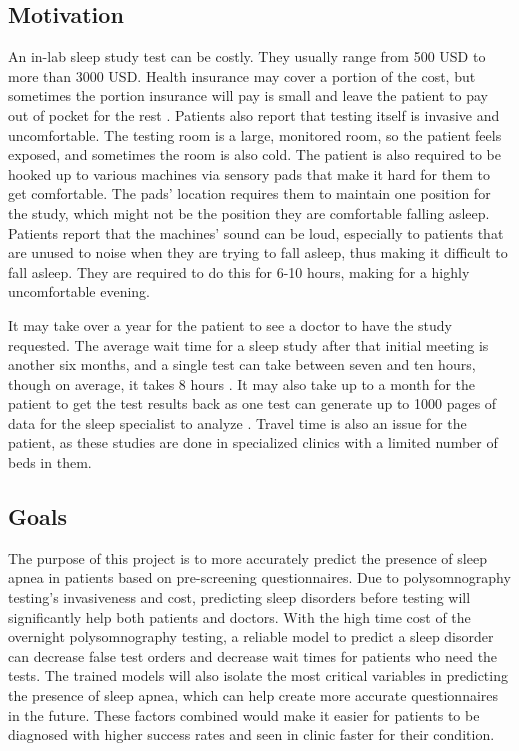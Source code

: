 \documentclass[10pt,conference,a4paper]{IEEEtran}
\begin{document}
\subsection{Motivation}

An in-lab sleep study test can be costly. They usually range from 500 USD to more than 3000 USD. Health insurance may cover a portion of the cost, but sometimes the portion insurance will pay is small and leave the patient to pay out of pocket for the rest \cite{apneaCost}. Patients also report that testing itself is invasive and uncomfortable. The testing room is a large, monitored room, so the patient feels exposed, and sometimes the room is also cold. The patient is also required to be hooked up to various machines via sensory pads that make it hard for them to get comfortable. The pads’ location requires them to maintain one position for the study, which might not be the position they are comfortable falling asleep. Patients report that the machines’ sound can be loud, especially to patients that are unused to noise when they are trying to fall asleep, thus making it difficult to fall asleep. They are required to do this for 6-10 hours, making for a highly uncomfortable evening. 

It may take over a year for the patient to see a doctor to have the study requested. The average wait time for a sleep study after that initial meeting is another six months\cite{ Flemons2004}, and a single test can take between seven and ten hours, though on average, it takes 8 hours \cite{prinston}. It may also take up to a month for the patient to get the test results back as one test can generate up to 1000 pages of data for the sleep specialist to analyze\cite{ Flemons2004} . Travel time is also an issue for the patient, as these studies are done in specialized clinics with a limited number of beds in them\cite{ Flemons2004}. 

\subsection{Goals}

The purpose of this project is to more accurately predict the presence of sleep apnea in patients based on pre-screening questionnaires. Due to polysomnography testing’s invasiveness and cost, predicting sleep disorders before testing will significantly help both patients and doctors. With the high time cost of the overnight polysomnography testing, a reliable model to predict a sleep disorder can decrease false test orders and decrease wait times for patients who need the tests. The trained models will also isolate the most critical variables in predicting the presence of sleep apnea, which can help create more accurate questionnaires in the future. These factors combined would make it easier for patients to be diagnosed with higher success rates and seen in clinic faster for their condition. 
\end{document}
